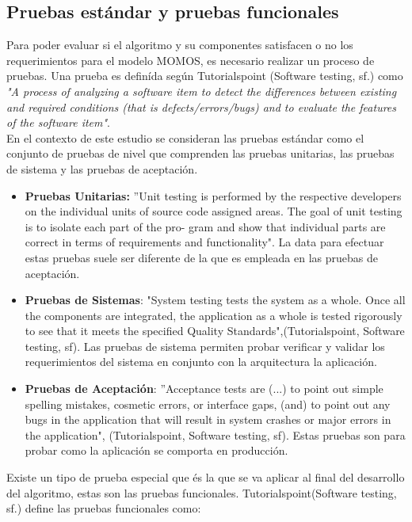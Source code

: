\subsection{Pruebas est\'andar y pruebas funcionales}

Para poder evaluar si el algoritmo y su componentes satisfacen o no los requerimientos para el modelo MOMOS, es necesario realizar un proceso de pruebas. Una prueba es definída seg\'un Tutorialspoint (Software testing, sf.) como \textit{"A process of analyzing a software item to detect the differences between existing and required conditions (that is defects/errors/bugs) and to evaluate the features of the software item"}.\\

En el contexto de este estudio se consideran las pruebas est\'andar como el conjunto de pruebas de nivel que comprenden las pruebas unitarias, las pruebas de sistema y las pruebas de aceptaci\'on.

\begin{itemize}
	\item \textbf{Pruebas Unitarias:} ”Unit testing is performed by the respective developers on the individual units of source code assigned areas. The goal of unit testing is to isolate each part of the pro- gram and show that individual parts are correct in terms of requirements and functionality". La data para efectuar estas pruebas suele ser diferente de la que es empleada en las pruebas de aceptaci\'on.
	\item \textbf{Pruebas de Sistemas}: "System testing tests the system as a whole. Once all the components are integrated, the application as a whole is tested rigorously to see that it meets the specified Quality Standards",(Tutorialspoint, Software testing, sf). Las pruebas de sistema permiten probar verificar y validar los requerimientos del sistema en conjunto con la arquitectura la aplicaci\'on.
	\item \textbf{Pruebas de Aceptaci\'on}: ”Acceptance tests are (...) to point out simple spelling mistakes, cosmetic errors, or interface gaps, (and) to point out any bugs in the application that will result in system crashes or major errors in the application", (Tutorialspoint, Software testing, sf). Estas pruebas son para probar como la aplicaci\'on se comporta en producci\'on.
\end{itemize}

Existe un tipo de prueba especial que \'es la que se va aplicar al final del desarrollo del algoritmo, estas son las pruebas funcionales. Tutorialspoint(Software testing, sf.) define las pruebas funcionales como:

